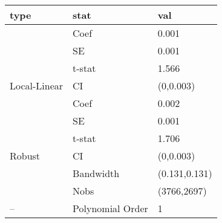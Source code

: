
\begin{tabular}{lll}
\toprule
type & stat & val\\
\midrule
 & Coef & 0.001\\

 & SE & 0.001\\

 & t-stat & 1.566\\

\multirow{-4}{*}{\raggedright\arraybackslash Local-Linear} & CI & (0,0.003)\\
\cmidrule{1-3}
 & Coef & 0.002\\

 & SE & 0.001\\

 & t-stat & 1.706\\

\multirow{-4}{*}{\raggedright\arraybackslash Robust} & CI & (0,0.003)\\
\cmidrule{1-3}
 & Bandwidth & (0.131,0.131)\\

 & Nobs & (3766,2697)\\

\multirow{-3}{*}{\raggedright\arraybackslash --} & Polynomial Order & 1\\
\bottomrule
\end{tabular}